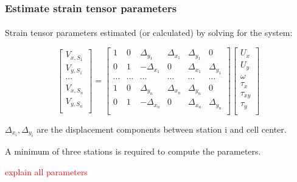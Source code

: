 \begin{frame}
 \frametitle{Estimate strain tensor parameters}
 \framesubtitle{}
 \label{ch2:}
 
 Strain tensor parameters estimated (or calculated) by solving for the system:
 
 \[
  \begin{bmatrix}
    V_{x,S_1} \\ 
    V_{y,S_1} \\ 
    \cdots \\ 
    V_{x,S_n} \\ 
    V_{y,S_n} \\ 
  \end{bmatrix}
  =
  \begin{bmatrix}
    1 & 0 & \Delta_{y_1}  & \Delta_{x_1} & \Delta_{y_1} & 0 \\
    0 & 1 & -\Delta_{x_1} &  0           & \Delta_{x_1} & \Delta_{y_1} \\
    \cdots & \cdots & \cdots & \cdots & \cdots & \cdots \\
    1 & 0 & \Delta_{y_n}  & \Delta_{x_n} & \Delta_{y_n} & 0 \\
    0 & 1 & -\Delta_{x_n} &  0           & \Delta_{x_n} & \Delta_{y_n} \\
  \end{bmatrix}
  \begin{bmatrix}
    U_{x} \\ 
    U_{y} \\ 
    \omega \\ 
    \tau_{x} \\ 
    \tau_{xy} \\ 
    \tau_{y} \\ 
  \end{bmatrix}
  \]
  
  $\Delta_{x_i}, \Delta_{y_i}$ are the displacement components between station i and cell center.
  
  A minimum of three stations is required to compute the parameters.
  
  \textcolor{red}{explain all parameters}
  

\end{frame}
\note{}

